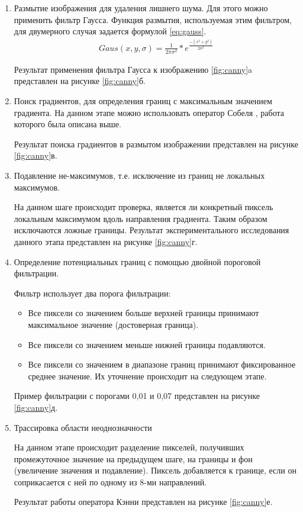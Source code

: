 \begin{enumerate}
	\item Размытие изображения для удаления лишнего шума. Для этого можно применить фильтр Гаусса\cite{shapiro:2001}.
	Функция размытия, используемая этим фильтром, для двумерного случая задается формулой  \ref{eq:gauss}.
	\begin{eqnarray}\label{eq:gauss}
	Gaus(x, y, \sigma) = \frac{1}{2 \pi \sigma^2}*e^{\frac{-(x^2+y^2)}{2\sigma^2}}
	\end{eqnarray}
	
	Результат применения фильтра Гаусса к изображению \ref{fig:canny}a представлен на рисунке \ref{fig:canny}б.
	
	\item Поиск градиентов, для определения границ с максимальным значением градиента.
	На данном этапе можно использовать оператор Собеля \cite{Sobel}, работа которого была описана выше.
	
	Результат поиска градиентов в размытом изображении представлен на рисунке \ref{fig:canny}в.
	
	\item Подавление не-максимумов, т.е. исключение из границ не локальных максимумов.
	
	На данном шаге происходит проверка, является ли конкретный пиксель локальным максимумом вдоль направления градиента. Таким образом исключаются ложные границы. Результат экспериментального исследования данного этапа представлен на рисунке \ref{fig:canny}г.
	
	\item Определение потенциальных границ с помощью двойной пороговой фильтрации.
	
	Фильтр использует два порога фильтрации:
	\begin{itemize}
		\item Все пиксели со значением больше верхней границы принимают максимальное значение (достоверная граница).
		\item Все пиксели со значением меньше нижней границы подавляются.
		\item Все пиксели со значением в диапазоне границ принимают фиксированное среднее значение. Их уточнение происходит на следующем этапе.
	\end{itemize}

	Пример фильтрации с порогами 0,01 и 0,07 представлен на рисунке \ref{fig:canny}д.

	\item Трассировка области неоднозначности
	
	На данном этапе происходит разделение пикселей, получивших промежуточное значение на предыдущем шаге, на границы и фон (увеличение значения и подавление). Пиксель добавляется к границе, если он соприкасается с ней по одному из 8-ми направлений.
	
	Результат работы оператора Кэнни представлен на рисунке \ref{fig:canny}е.
\end{enumerate}


